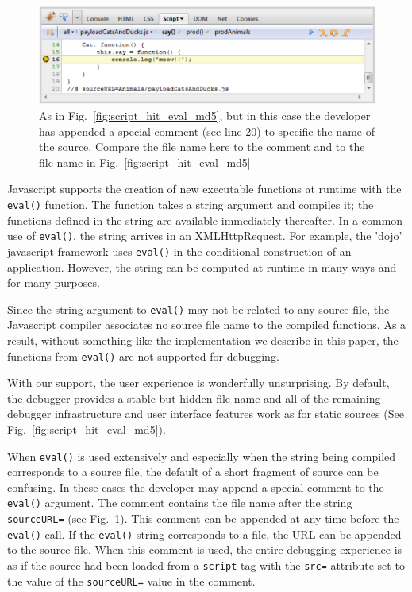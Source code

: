 \documentclass{www2010-accepted}
\begin{document}
\begin{figure}[htp]
\center
\includegraphics[scale=0.7]{script_hit_eval_userURL.eps}
\caption{As in Fig.~\ref{fig:script_hit_eval_md5}, but in this case
the developer has appended a special comment (see line 20) to specific
the name of the source. Compare the file name here to the comment and
to the file name in Fig.~\ref{fig:script_hit_eval_md5} }
\label{fig:script_hit_eval_userURL}
\end{figure}


Javascript supports the creation of new executable functions at
runtime with the \texttt{eval()} function. The function takes a string
argument and compiles it; the functions defined in the string are
available immediately thereafter. In a common use of \texttt{eval()},
the string arrives in an XMLHttpRequest. For example, the 'dojo'
javascript framework uses \texttt{eval()} in the conditional construction of
an application\cite{felocity2007JIT}.  However, the string can be computed at runtime
in many ways and for many purposes.

Since the string argument to \texttt{eval()} may not be related to any
source file, the Javascript compiler associates no source file name to
the compiled functions. As a result, without something like the implementation
we describe in this paper, the functions from \texttt{eval()}
are not supported for debugging.

With our support, the user experience is wonderfully unsurprising.
By default, the debugger provides a stable but hidden file name and
all of the remaining debugger infrastructure and user
interface features work as for static sources (See Fig.~\ref{fig:script_hit_eval_md5}).

When \texttt{eval()} is used extensively and especially when the
string being compiled corresponds to a source file, the default of a
short fragment of source can be confusing. In these cases the
developer may append a special comment to the \texttt{eval()} argument. The comment
contains the file name after the string \texttt{sourceURL=} (see
Fig.~\ref{fig:script_hit_eval_userURL}).  This comment can be appended
at any time before the \texttt{eval()} call.  If the \texttt{eval()}
string corresponds to a file, the URL can be appended to the source
file.  When this comment is used, the entire debugging experience is as if the
source had been loaded from a \texttt{script} tag with the \texttt{src=}
attribute set to the value of the \texttt{sourceURL=} value in the
comment.
\end{document}
